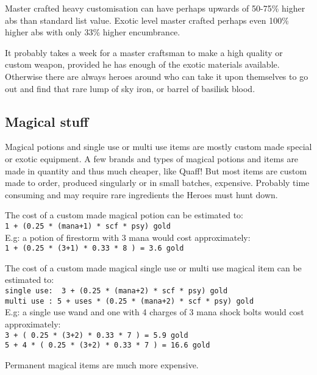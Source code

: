 Master crafted heavy customisation can have perhaps upwards of 50-75\% higher abs than standard list value. Exotic level master crafted perhaps even 100\% higher abs with only 33\% higher encumbrance.

It probably takes a week for a master craftsman to make a high quality or custom weapon, provided he has enough of the exotic materials available. Otherwise there are always heroes around who can take it upon themselves to go out and find that rare lump of sky iron, or barrel of basilisk blood.


\subsection*{Magical stuff}
Magical potions and single use or multi use items are mostly custom made special or exotic equipment. A few brands and types of magical potions and items are made in quantity and thus much cheaper, like Quaff! But most items are custom made to order, produced singularly or in small batches, expensive. Probably time consuming and may require rare ingredients the Heroes must hunt down.

\noindent
The cost of a custom made magical potion can be estimated to:\\
\verb|1 + (0.25 * (mana+1) * scf * psy) gold| \\
E.g: a potion of firestorm with 3 mana would cost approximately:\\
\verb|1 + (0.25 * (3+1) * 0.33 * 8 ) = 3.6 gold|

\noindent
The cost of a custom made magical single use or multi use magical item can be estimated to: \\
\verb|single use:  3 + (0.25 * (mana+2) * scf * psy) gold| \\
\verb|multi use : 5 + uses * (0.25 * (mana+2) * scf * psy) gold| \\
E.g: a single use wand and one with 4 charges of 3 mana shock bolts would cost approximately: \\
\verb|3 + ( 0.25 * (3+2) * 0.33 * 7 ) = 5.9 gold| \\            %
\verb|5 + 4 * ( 0.25 * (3+2) * 0.33 * 7 ) = 16.6 gold|         %

\noindent
Permanent magical items are much more expensive.

















